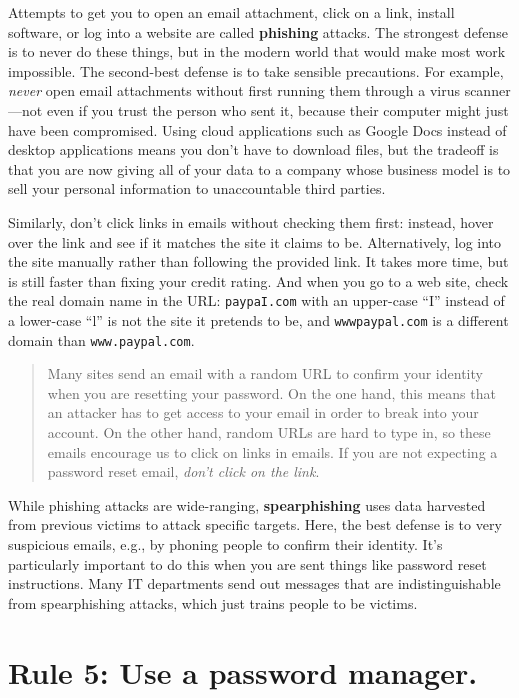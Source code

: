 \documentclass[10pt,letterpaper]{article}
\newcommand{\rulemajor}[1]{\section*{#1}}
\begin{document}
Attempts to get you to open an email attachment,
click on a link,
install software,
or log into a website are called \textbf{phishing} attacks.
The strongest defense is to never do these things,
but in the modern world that would make most work impossible.
The second-best defense is to take sensible precautions.
For example,
\emph{never} open email attachments without first running them through a virus scanner---not even
if you trust the person who sent it,
because their computer might just have been compromised.
Using cloud applications such as Google Docs instead of desktop applications means you don't have to download files,
but the tradeoff is that you are now giving all of your data to a company
whose business model is to sell your personal information to unaccountable third parties.

Similarly,
don't click links in emails without checking them first:
instead,
hover over the link and see if it matches the site it claims to be.
Alternatively,
log into the site manually rather than following the provided link.
It takes more time,
but is still faster than fixing your credit rating.
And when you go to a web site,
check the real domain name in the URL:
\texttt{paypaI.com} with an upper-case ``I'' instead of a lower-case ``l'' is not the site it pretends to be,
and \texttt{wwwpaypal.com} is a different domain than \texttt{www.paypal.com}.

\begin{quote}
  Many sites send an email with a random URL to confirm your identity when you are resetting your password.
  On the one hand,
  this means that an attacker has to get access to your email in order to break into your account.
  On the other hand,
  random URLs are hard to type in,
  so these emails encourage us to click on links in emails.
  If you are not expecting a password reset email,
  \emph{don't click on the link}.
\end{quote}

While phishing attacks are wide-ranging,
\textbf{spearphishing} uses data harvested from previous victims to attack specific targets.
Here,
the best defense is to very suspicious emails,
e.g., by phoning people to confirm their identity.
It's particularly important to do this when you are sent
things like password reset instructions.
Many IT departments send out messages that are indistinguishable from spearphishing attacks,
which just trains people to be victims.

\rulemajor{Rule 5: Use a password manager.}
\end{document}
